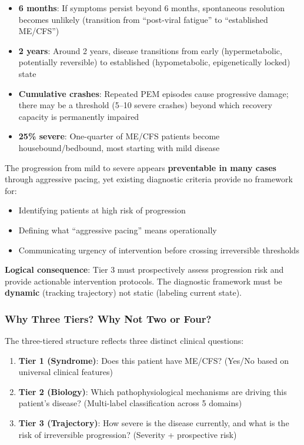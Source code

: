 \begin{itemize}
    \item \textbf{6 months}: If symptoms persist beyond 6 months, spontaneous resolution becomes unlikely (transition from ``post-viral fatigue'' to ``established ME/CFS'')
    \item \textbf{2 years}: Around 2 years, disease transitions from early (hypermetabolic, potentially reversible) to established (hypometabolic, epigenetically locked) state
    \item \textbf{Cumulative crashes}: Repeated PEM episodes cause progressive damage; there may be a threshold (5--10 severe crashes) beyond which recovery capacity is permanently impaired
    \item \textbf{25\% severe}: One-quarter of ME/CFS patients become housebound/bedbound, most starting with mild disease
\end{itemize}

The progression from mild to severe appears \textbf{preventable in many cases} through aggressive pacing, yet existing diagnostic criteria provide no framework for:
\begin{itemize}
    \item Identifying patients at high risk of progression
    \item Defining what ``aggressive pacing'' means operationally
    \item Communicating urgency of intervention before crossing irreversible thresholds
\end{itemize}

\textbf{Logical consequence}: Tier 3 must prospectively assess progression risk and provide actionable intervention protocols. The diagnostic framework must be \textbf{dynamic} (tracking trajectory) not static (labeling current state).

\subsubsection{Why Three Tiers? Why Not Two or Four?}

The three-tiered structure reflects three distinct clinical questions:

\begin{enumerate}
    \item \textbf{Tier 1 (Syndrome)}: Does this patient have ME/CFS? (Yes/No based on universal clinical features)
    \item \textbf{Tier 2 (Biology)}: Which pathophysiological mechanisms are driving this patient's disease? (Multi-label classification across 5 domains)
    \item \textbf{Tier 3 (Trajectory)}: How severe is the disease currently, and what is the risk of irreversible progression? (Severity + prospective risk)
\end{enumerate}

